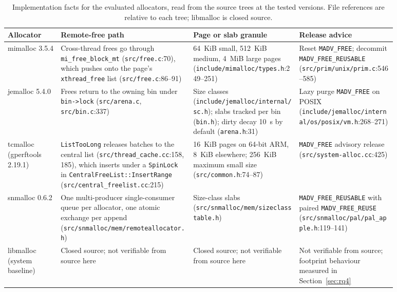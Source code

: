 \begin{table}[!htbp]
\centering
\scriptsize
\setlength{\tabcolsep}{3pt}
\caption{Implementation facts for the evaluated allocators, read from the source trees at the tested versions. File references are relative to each tree; libmalloc is closed source.}
\label{tab:taxonomy}
\begin{tabular}{p{0.12\linewidth}p{0.30\linewidth}p{0.24\linewidth}p{0.22\linewidth}}
\toprule
Allocator & Remote-free path & Page or slab granule & Release advice\\
\midrule
mimalloc 3.5.4 & Cross-thread frees go through \texttt{mi\_free\_block\_mt} (\texttt{src/\allowbreak free.\allowbreak c}:70), which pushes onto the page's \texttt{xthread\_free} list (\texttt{src/\allowbreak free.\allowbreak c}:86--91) & 64~KiB small, 512~KiB medium, 4~MiB large pages (\texttt{include/\allowbreak mimalloc/\allowbreak types.\allowbreak h}:249--251) & Reset \texttt{MADV\_FREE}; decommit \texttt{MADV\_FREE\_REUSABLE} (\texttt{src/\allowbreak prim/\allowbreak unix/\allowbreak prim.\allowbreak c}:546--585) \\
jemalloc 5.4.0 & Frees return to the owning bin under \texttt{bin->lock} (\texttt{src/\allowbreak arena.\allowbreak c}, \texttt{src/\allowbreak bin.\allowbreak c}:337) & Size classes (\texttt{include/\allowbreak jemalloc/\allowbreak internal/\allowbreak sc.\allowbreak h}); slabs tracked per bin (\texttt{bin.\allowbreak h}); dirty decay 10~s by default (\texttt{arena.\allowbreak h}:31) & Lazy purge \texttt{MADV\_FREE} on POSIX (\texttt{include/\allowbreak jemalloc/\allowbreak internal/\allowbreak os/\allowbreak \allowbreak posix/\allowbreak vm.\allowbreak h}:268--271) \\
tcmalloc (gperftools 2.19.1) & \texttt{ListTooLong} releases batches to the central list (\texttt{src/\allowbreak thread\_cache.\allowbreak cc}:158, 185), which inserts under a \texttt{SpinLock} in \texttt{CentralFreeList:\allowbreak :\allowbreak InsertRange} (\texttt{src/\allowbreak central\_freelist.\allowbreak cc}:215) & 16~KiB pages on 64-bit ARM, 8~KiB elsewhere; 256~KiB maximum small size (\texttt{src/\allowbreak common.\allowbreak h}:74--87) & \texttt{MADV\_FREE} advisory release (\texttt{src/\allowbreak system-alloc.\allowbreak cc}:425) \\
snmalloc 0.6.2 & One multi-producer single-consumer queue per allocator, one atomic exchange per append (\texttt{src/\allowbreak snmalloc/\allowbreak mem/\allowbreak remoteallocator.\allowbreak h}) & Size-class slabs (\texttt{src/\allowbreak snmalloc/\allowbreak mem/\allowbreak sizeclasstable.\allowbreak h}) & \texttt{MADV\_FREE\_REUSABLE} with paired \texttt{MADV\_FREE\_REUSE} (\texttt{src/\allowbreak snmalloc/\allowbreak pal/\allowbreak pal\_apple.\allowbreak h}:119--141) \\
libmalloc (system baseline) & Closed source; not verifiable from source here & Closed source; not verifiable from source here & Not verifiable from source; footprint behaviour measured in Section~\ref{sec:rq4} \\
\bottomrule
\end{tabular}
\end{table}
